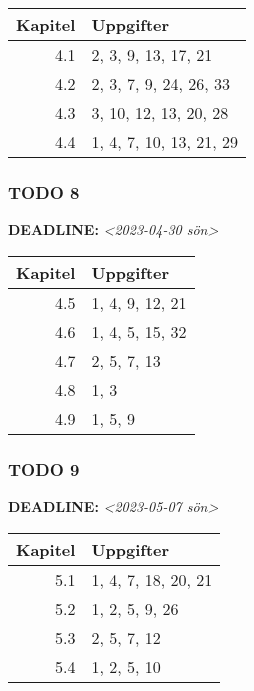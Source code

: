 \documentclass[11pt]{article}
\begin{document}
\begin{center}
\begin{tabular}{rl}
Kapitel & Uppgifter\\[0pt]
\hline
4.1 & 2, 3, 9, 13, 17, 21\\[0pt]
4.2 & 2, 3, 7, 9, 24, 26, 33\\[0pt]
4.3 & 3, 10, 12, 13, 20, 28\\[0pt]
4.4 & 1, 4, 7, 10, 13, 21, 29\\[0pt]
\end{tabular}
\end{center}

\subsubsection{{\bfseries\sffamily TODO} 8}
\label{sec:orga0ef65a}
\noindent\textbf{DEADLINE:} \textit{<2023-04-30 sön>}\\[0pt]

\begin{center}
\begin{tabular}{rl}
Kapitel & Uppgifter\\[0pt]
\hline
4.5 & 1, 4, 9, 12, 21\\[0pt]
4.6 & 1, 4, 5, 15, 32\\[0pt]
4.7 & 2, 5, 7, 13\\[0pt]
4.8 & 1, 3\\[0pt]
4.9 & 1, 5, 9\\[0pt]
\end{tabular}
\end{center}

\subsubsection{{\bfseries\sffamily TODO} 9}
\label{sec:org4006174}
\noindent\textbf{DEADLINE:} \textit{<2023-05-07 sön>}\\[0pt]

\begin{center}
\begin{tabular}{rl}
Kapitel & Uppgifter\\[0pt]
\hline
5.1 & 1, 4, 7, 18, 20, 21\\[0pt]
5.2 & 1, 2, 5, 9, 26\\[0pt]
5.3 & 2, 5, 7, 12\\[0pt]
5.4 & 1, 2, 5, 10\\[0pt]
\end{tabular}
\end{center}
\end{document}
